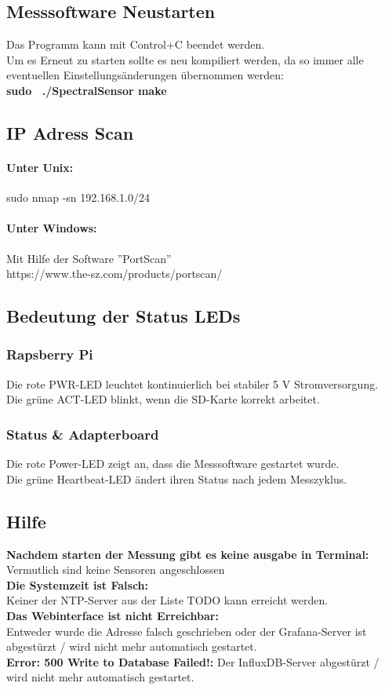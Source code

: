 \subsection{Messsoftware Neustarten}
\label{restart}
Das Programm kann mit Control+C beendet werden.\\
Um es Erneut zu starten sollte es neu kompiliert werden, da so immer alle eventuellen Einstellungsänderungen übernommen werden:\\
\textbf{sudo ~./SpectralSensor make}\\




\subsection{IP Adress Scan}
\paragraph{Unter Unix:} sudo nmap -sn 192.168.1.0/24  
\paragraph{Unter Windows:} Mit Hilfe der Software ''PortScan'' \\https://www.the-sz.com/products/portscan/\smallskip

\subsection{Bedeutung der Status LEDs}\label{leds}
\subsubsection{Rapsberry Pi}
Die rote PWR-LED leuchtet kontinuierlich bei stabiler 5 V Stromversorgung.\\
Die grüne ACT-LED blinkt, wenn die SD-Karte korrekt arbeitet.
\subsubsection{Status \& Adapterboard}
Die rote Power-LED zeigt an, dass die Messsoftware gestartet wurde.\\
Die grüne Heartbeat-LED ändert ihren Status nach jedem Messzyklus.\\


\subsection{Hilfe}
\textbf{Nachdem starten der Messung gibt es keine ausgabe in Terminal:}\\
Vermutlich sind keine Sensoren angeschlossen\\
\textbf{Die Systemzeit ist Falsch:}\\
Keiner der NTP-Server aus der Liste TODO kann erreicht werden.\\
\textbf{Das Webinterface ist nicht Erreichbar:}\\
Entweder wurde die Adresse falsch geschrieben oder der Grafana-Server ist abgestürzt / wird nicht mehr automatisch gestartet.\\
\textbf{Error: 500
Write to Database Failed!:}
Der InfluxDB-Server abgestürzt / wird nicht mehr automatisch gestartet.

